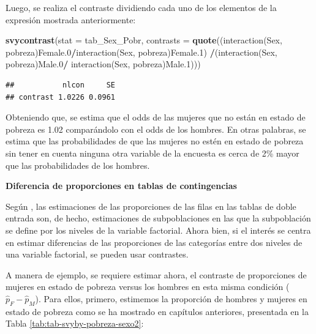 \documentclass[
  spanish,
  12pt,
]{book}
\newenvironment{Shaded}{\begin{snugshade}}{\end{snugshade}}
\newcommand{\AttributeTok}[1]{\textcolor[rgb]{0.13,0.29,0.53}{#1}}
\newcommand{\FunctionTok}[1]{\textcolor[rgb]{0.13,0.29,0.53}{\textbf{#1}}}
\newcommand{\NormalTok}[1]{#1}
\newcommand{\SpecialCharTok}[1]{\textcolor[rgb]{0.81,0.36,0.00}{\textbf{#1}}}
\newcommand{\StringTok}[1]{\textcolor[rgb]{0.31,0.60,0.02}{#1}}
\begin{document}
Luego, se realiza el contraste dividiendo cada uno de los elementos de la expresión mostrada anteriormente:

\begin{Shaded}
\begin{Highlighting}[]
\FunctionTok{svycontrast}\NormalTok{(}\AttributeTok{stat =}\NormalTok{ tab\_Sex\_Pobr, }
\AttributeTok{contrasts =} \FunctionTok{quote}\NormalTok{((}\StringTok{\textasciigrave{}}\AttributeTok{interaction(Sex, pobreza)Female.0}\StringTok{\textasciigrave{}}\SpecialCharTok{/}\StringTok{\textasciigrave{}}\AttributeTok{interaction(Sex, pobreza)Female.1}\StringTok{\textasciigrave{}}\NormalTok{) }\SpecialCharTok{/}\NormalTok{(}\StringTok{\textasciigrave{}}\AttributeTok{interaction(Sex, pobreza)Male.0}\StringTok{\textasciigrave{}}\SpecialCharTok{/} \StringTok{\textasciigrave{}}\AttributeTok{interaction(Sex, pobreza)Male.1}\StringTok{\textasciigrave{}}\NormalTok{)))}
\end{Highlighting}
\end{Shaded}

\begin{verbatim}
##           nlcon     SE
## contrast 1.0226 0.0961
\end{verbatim}

Obteniendo que, se estima que el odds de las mujeres que no están en estado de pobreza es 1.02 comparándolo con el odds de los hombres. En otras palabras, se estima que las probabilidades de que las mujeres no estén en estado de pobreza sin tener en cuenta ninguna otra variable de la encuesta es cerca de 2\% mayor que las probabilidades de los hombres.

\textbf{Diferencia de proporciones en tablas de contingencias}

Según \citet{heeringa2017applied}, las estimaciones de las proporciones de las filas en las tablas de doble entrada son, de hecho, estimaciones de subpoblaciones en las que la subpoblación se define por los niveles de la variable factorial. Ahora bien, si el interés se centra en estimar diferencias de las proporciones de las categorías entre dos niveles de una variable factorial, se pueden usar contrastes.

A manera de ejemplo, se requiere estimar ahora, el contraste de proporciones de mujeres en estado de pobreza versus los hombres en esta misma condición (\(\hat{p}_F - \hat{p}_M\)). Para ellos, primero, estimemos la proporción de hombres y mujeres en estado de pobreza como se ha mostrado en capítulos anteriores, presentada en la Tabla \ref{tab:tab-svyby-pobreza-sexo2}:
\end{document}

